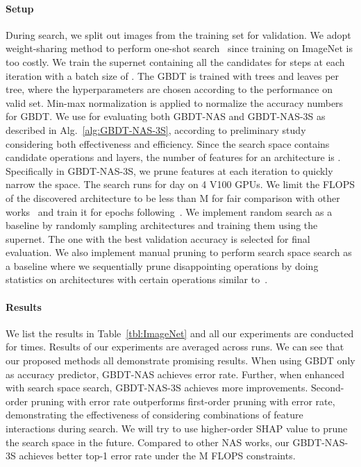 \documentclass{article}
\begin{document}
\paragraph{Setup}
During search, we split out  images from the training set for validation. We adopt weight-sharing method to perform one-shot search~\cite{enas} since training on ImageNet is too costly. We train the supernet containing all the candidates for  steps at each iteration with a batch size of . The GBDT is trained with  trees and  leaves per tree, where the hyperparameters are chosen according to the performance on valid set. Min-max normalization is applied to normalize the accuracy numbers for GBDT. We use  for evaluating both GBDT-NAS and GBDT-NAS-3S as described in Alg.~\ref{alg:GBDT-NAS-3S}, according to preliminary study considering both effectiveness and efficiency. Since the search space contains  candidate operations and  layers, the number of features for an architecture is . Specifically in GBDT-NAS-3S, we prune  features at each iteration to quickly narrow the space. The search runs for  day on 4 V100 GPUs. We limit the FLOPS of the discovered architecture to be less than M for fair comparison with other works~\cite{nasnet,amoebanet,darts,efficientnet,pcdarts,pdarts} and train it for  epochs following~\cite{proxylessnas}. We implement random search as a baseline by randomly sampling  architectures and training them using the supernet. The one with the best validation accuracy is selected for final evaluation. We also implement manual pruning to perform search space search as a baseline where we sequentially prune disappointing operations by doing statistics on architectures with certain operations similar to~\cite{designspace}.
\paragraph{Results} We list the results in Table~\ref{tbl:ImageNet} and all our experiments are conducted for  times. Results of our experiments are averaged across  runs. We can see that our proposed methods all demonstrate promising results. When using GBDT only as accuracy predictor, GBDT-NAS achieves  error rate. Further, when enhanced with search space search, GBDT-NAS-3S achieves more improvements. Second-order pruning with  error rate outperforms first-order pruning with  error rate, demonstrating the effectiveness of considering combinations of feature interactions during search. We will try to use higher-order SHAP value to prune the search space in the future. Compared to other NAS works, our GBDT-NAS-3S achieves better top-1 error rate under the M FLOPS constraints.
\end{document}
